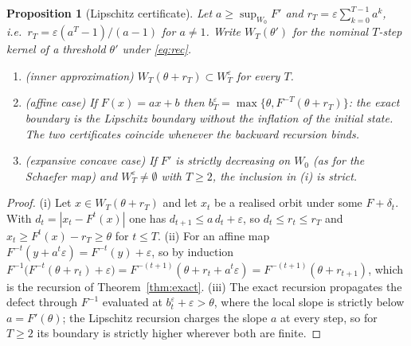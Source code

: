 \documentclass[11pt,a4paper]{article}
\theoremstyle{plain}
\newtheorem{proposition}[theorem]{Proposition}
\theoremstyle{definition}
\theoremstyle{remark}
\newcommand{\safe}{W_0}
\newcommand{\LRP}{\theta}
\begin{document}
\begin{proposition}[Lipschitz certificate]\label{prop:lip}
Let $a\ge\sup_{\safe}F'$ and $r_T=\varepsilon\sum_{k=0}^{T-1}a^{k}$, i.e.\ $r_T=\varepsilon(a^{T}-1)/(a-1)$ for $a\neq1$. Write $W_T(\LRP')$ for the nominal $T$-step kernel of a threshold $\LRP'$ under \eqref{eq:rec}.
\begin{enumerate}[label=(\roman*)]
\item (inner approximation) $W_T(\LRP+r_T)\subset W^{\varepsilon}_T$ for every $T$.
\item (affine case) If $F(x)=ax+b$ then $b^{\varepsilon}_T=\max\{\LRP,F^{-T}(\LRP+r_T)\}$: the exact boundary is the Lipschitz boundary without the inflation of the initial state. The two certificates coincide whenever the backward recursion binds.
\item (expansive concave case) If $F'$ is strictly decreasing on $\safe$ (as for the Schaefer map) and $W^{\varepsilon}_T\neq\emptyset$ with $T\ge2$, the inclusion in (i) is strict.
\end{enumerate}
\end{proposition}
\begin{proof}
(i) Let $x\in W_T(\LRP+r_T)$ and let $x_t$ be a realised orbit under some $F+\delta_t$. With $d_t=|x_t-F^{t}(x)|$ one has $d_{t+1}\le a\,d_t+\varepsilon$, so $d_t\le r_t\le r_T$ and $x_t\ge F^{t}(x)-r_T\ge\LRP$ for $t\le T$. (ii) For an affine map $F^{-t}(y+a^{t}\varepsilon)=F^{-t}(y)+\varepsilon$, so by induction $F^{-1}\bigl(F^{-t}(\LRP+r_t)+\varepsilon\bigr)=F^{-(t+1)}(\LRP+r_t+a^{t}\varepsilon)=F^{-(t+1)}(\LRP+r_{t+1})$, which is the recursion of Theorem~\ref{thm:exact}. (iii) The exact recursion propagates the defect through $F^{-1}$ evaluated at $b^{\varepsilon}_t+\varepsilon>\LRP$, where the local slope is strictly below $a=F'(\LRP)$; the Lipschitz recursion charges the slope $a$ at every step, so for $T\ge2$ its boundary is strictly higher wherever both are finite.
\end{proof}
\end{document}
